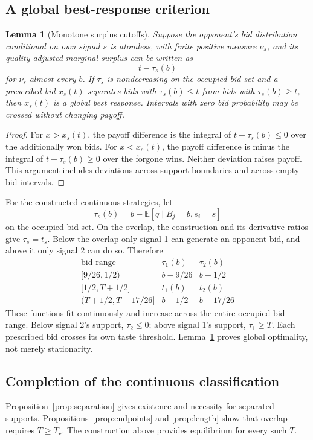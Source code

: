 \documentclass[11pt,a4paper]{article}
\numberwithin{equation}{section}
\newtheorem{lemma}[theorem]{Lemma}
\theoremstyle{definition}
\theoremstyle{remark}
\newcommand{\E}{\mathbb E}
\newcommand{\Ts}{T_\star}
\begin{document}
\subsection{A global best-response criterion}
\begin{lemma}[Monotone surplus cutoffs]
\label{lem:globalsuff}
Suppose the opponent's bid distribution conditional on own signal $s$ is atomless, with finite positive measure $\nu_s$, and its quality-adjusted marginal surplus can be written as
\[
 t-\tau_s(b)
\]
for $\nu_s$-almost every $b$. If $\tau_s$ is nondecreasing on the occupied bid set and a prescribed bid $x_s(t)$ separates bids with $\tau_s(b)\le t$ from bids with $\tau_s(b)\ge t$, then $x_s(t)$ is a global best response. Intervals with zero bid probability may be crossed without changing payoff.
\end{lemma}
\begin{proof}
For $x>x_s(t)$, the payoff difference is the integral of $t-\tau_s(b)\le0$ over the additionally won bids. For $x<x_s(t)$, the payoff difference is minus the integral of $t-\tau_s(b)\ge0$ over the forgone wins. Neither deviation raises payoff. This argument includes deviations across support boundaries and across empty bid intervals.
\end{proof}

For the constructed continuous strategies, let
\[
 \tau_s(b)=b-\E[q\mid B_j=b,s_i=s]
\]
on the occupied bid set. On the overlap, the construction and its derivative ratios give $\tau_s=t_s$. Below the overlap only signal 1 can generate an opponent bid, and above it only signal 2 can do so. Therefore
\begin{equation}
\label{eq:globaltau}
\begin{array}{c|cc}
\text{bid range}&\tau_1(b)&\tau_2(b)\\ \hline
\bigl[9/26,1/2\bigr)&b-9/26&b-1/2\\
\bigl[1/2,T+1/2\bigr]&t_1(b)&t_2(b)\\
(T+1/2,T+17/26]&b-1/2&b-17/26
\end{array}
\end{equation}
These functions fit continuously and increase across the entire occupied bid range. Below signal 2's support, $\tau_2\le0$; above signal 1's support, $\tau_1\ge T$. Each prescribed bid crosses its own taste threshold. Lemma~\ref{lem:globalsuff} proves global optimality, not merely stationarity.

\subsection{Completion of the continuous classification}
Proposition~\ref{prop:separation} gives existence and necessity for separated supports. Propositions~\ref{prop:endpoints} and \ref{prop:length} show that overlap requires $T\ge\Ts$. The construction above provides equilibrium for every such $T$.
\end{document}
